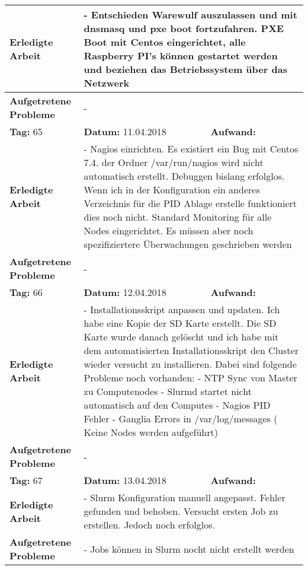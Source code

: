 \begin{longtable}{|p{5cm}|p{5cm}|p{6cm}|}
\textbf{Erledigte Arbeit} & \multicolumn{2}{p{11cm}|}{- Entschieden Warewulf auszulassen und mit dnsmasq und pxe boot fortzufahren. PXE Boot mit Centos eingerichtet, alle Raspberry PI's können gestartet werden und beziehen das Betriebssystem über das Netzwerk} \\ \hline
\textbf{Aufgetretene Probleme} & \multicolumn{2}{p{11cm}|}{-} \\ \hline
\rowcolor{heading}\textbf{Tag:} 65 & \textbf{Datum:} 11.04.2018 & \textbf{Aufwand:} \\ \hline
\textbf{Erledigte Arbeit} & \multicolumn{2}{p{11cm}|}{- Nagios einrichten. Es existiert ein Bug mit Centos 7.4. der Ordner /var/run/nagios wird nicht automatisch erstellt. Debuggen bislang erfolglos. Wenn ich in der Konfiguration ein anderes Verzeichnis für die PID Ablage erstelle funktioniert dies noch nicht. Standard Monitoring für alle Nodes eingerichtet. Es müssen aber noch spezifiziertere Überwachungen geschrieben werden} \\ \hline
\textbf{Aufgetretene Probleme} & \multicolumn{2}{p{11cm}|}{-} \\ \hline
\rowcolor{heading}\textbf{Tag:} 66 & \textbf{Datum:} 12.04.2018 & \textbf{Aufwand:} \\ \hline
\textbf{Erledigte Arbeit} & \multicolumn{2}{p{11cm}|}{- Installationsskript anpassen und updaten. Ich habe eine Kopie der SD Karte erstellt. Die SD Karte wurde danach gelöscht und ich habe mit dem automatisierten Installationsskript den Cluster wieder versucht zu installieren. Dabei sind folgende Probleme noch vorhanden: \newline - NTP Sync von Master zu Computenodes \newline
- Slurmd startet nicht automatisch auf den Computes \newline 
- Nagios PID Fehler \newline 
- Ganglia Errors in /var/log/messages ( Keine Nodes werden aufgeführt)} \\ \hline
\textbf{Aufgetretene Probleme} & \multicolumn{2}{p{11cm}|}{-} \\ \hline
\rowcolor{heading}\textbf{Tag:} 67 & \textbf{Datum:} 13.04.2018 & \textbf{Aufwand:} \\ \hline
\textbf{Erledigte Arbeit} & \multicolumn{2}{p{11cm}|}{- Slurm Konfiguration manuell angepasst. Fehler gefunden und behoben. Versucht ersten Job zu erstellen. Jedoch noch erfolglos.} \\ \hline
\textbf{Aufgetretene Probleme} & \multicolumn{2}{p{11cm}|}{- Jobs können in Slurm nocht nicht erstellt werden} \\ \hline

\end{longtable}
